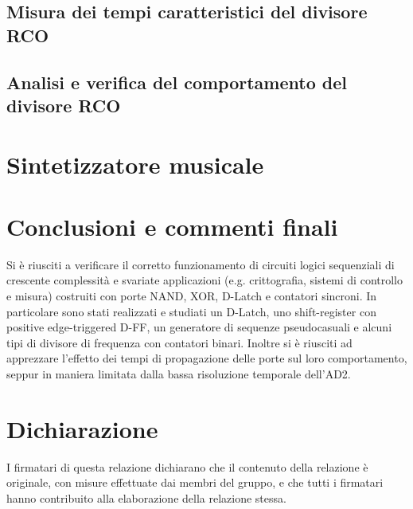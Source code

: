 \documentclass[10pt, a4paper, italian]{article}
\begin{document}
\subsection{Misura dei tempi caratteristici del divisore RCO}
\subsection{Analisi e verifica del comportamento del divisore RCO}

\section{Sintetizzatore musicale}

\section*{Conclusioni e commenti finali}
Si è riusciti a verificare il corretto funzionamento di circuiti logici
sequenziali di crescente complessità e svariate applicazioni (e.g.
crittografia, sistemi di controllo e misura) costruiti con porte NAND, XOR,
D-Latch e contatori sincroni.
In particolare sono stati realizzati e studiati un D-Latch, uno shift-register
con positive edge-triggered D-FF, un generatore di sequenze pseudocasuali e
alcuni tipi di divisore di frequenza con contatori binari.
Inoltre si è riusciti ad apprezzare l'effetto dei tempi di propagazione
delle porte sul loro comportamento, seppur in maniera limitata dalla bassa
risoluzione temporale dell'AD2.

\section*{Dichiarazione}
I firmatari di questa relazione dichiarano che il contenuto della relazione \`e
originale, con misure effettuate dai membri del gruppo, e che tutti i firmatari
hanno contribuito alla elaborazione della relazione stessa.
\end{document}
